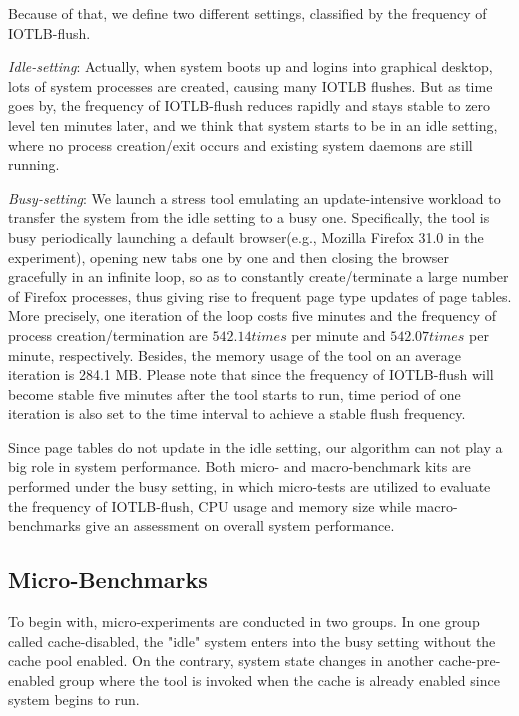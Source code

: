 Because of that, we define two different settings, classified by the frequency of IOTLB-flush.

\emph{Idle-setting}: Actually, when system boots up and logins into graphical desktop, lots of system processes are created, causing many IOTLB flushes. But as time goes by, the frequency of IOTLB-flush reduces rapidly and stays stable to zero level ten minutes later, and we think that system starts to be in an idle setting, where no process creation/exit occurs and existing system daemons are still running.

\emph{Busy-setting}: We launch a stress tool emulating an update-intensive workload to transfer the system from the idle setting to a busy one. Specifically, the tool is busy periodically launching a default browser(e.g., Mozilla Firefox 31.0 in the experiment), opening new tabs one by one and then closing the browser gracefully in an infinite loop, so as to constantly create/terminate a large number of Firefox processes, thus giving rise to frequent page type updates of page tables. More precisely, one iteration of the loop costs five minutes and the frequency of process creation/termination are $542.14 times$ per minute and $542.07 times$ per minute, respectively. Besides, the memory usage of the tool on an average iteration is 284.1 MB. Please note that since the frequency of IOTLB-flush will become stable five minutes after the tool starts to run, time period of one iteration is also set to the time interval to achieve a stable flush frequency.

Since page tables do not update in the idle setting, our algorithm can not play a big role in system performance. Both micro- and macro-benchmark kits are performed under the busy setting, in which micro-tests are utilized to evaluate the frequency of IOTLB-flush, CPU usage and memory size while macro-benchmarks give an assessment on overall system performance.

\subsection{Micro-Benchmarks}

To begin with, micro-experiments are conducted in two groups. In one group called cache-disabled, the "idle" system enters into the busy setting without the cache pool enabled. On the contrary, system state changes in another cache-pre-enabled group where the tool is invoked when the cache is already enabled since system begins to run.

